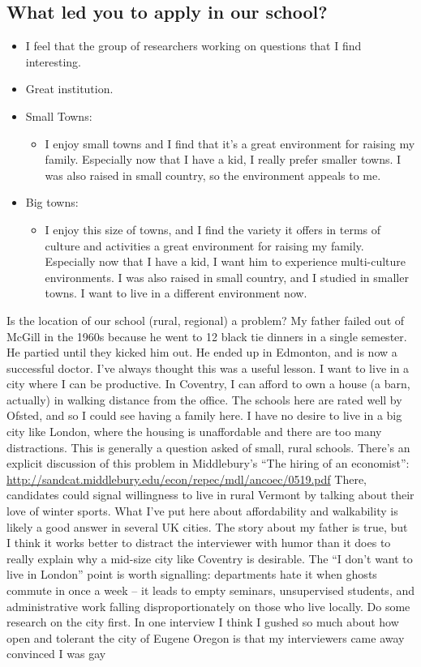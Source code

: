 \documentclass[12pt]{article}
\theoremstyle{plain}
\theoremstyle{plain}
\theoremstyle{plain}
\theoremstyle{plain}
\theoremstyle{plain}
\theoremstyle{plain}
\begin{document}
\subsection{What led you to apply in our school?}
\label{sec:orged3c6f1}
\begin{itemize}
\item I feel that the group of researchers working on questions that I find interesting.
\item Great institution.
\item Small Towns:
\begin{itemize}
\item I enjoy small towns and I find that it's a great environment for raising my family.
Especially now that I have a kid, I really prefer smaller towns.
I was also raised in small country, so the environment appeals to me.
\end{itemize}
\item Big towns:
\begin{itemize}
\item I enjoy this size of towns, and I find the variety it offers in terms of culture and activities a great environment for raising my family.
Especially now that I have a kid, I want him to experience multi-culture environments.
I was also raised in small country, and I studied in smaller towns. I want to live in a different environment now.
\end{itemize}
\end{itemize}


Is the location of our school (rural, regional) a problem?
My father failed out of McGill in the 1960s because he went to 12 black tie dinners in a single semester. He partied until they kicked him out. He ended up in Edmonton, and is now a successful doctor. I’ve always thought this was a useful lesson. I want to live in a city where I can be productive. In Coventry, I can afford to own a house (a barn, actually) in walking distance from the office. The schools here are rated well by Ofsted, and so I could see having a family here. I have no desire to live in a big city like London, where the housing is unaffordable and there are too many distractions.
This is generally a question asked of small, rural schools. There’s an explicit discussion of this problem in Middlebury’s “The hiring of an economist”:
\url{http://sandcat.middlebury.edu/econ/repec/mdl/ancoec/0519.pdf}
There, candidates could signal willingness to live in rural Vermont by talking about their love of winter sports. What I’ve put here about affordability and walkability is likely a good answer in several UK cities. The story about my father is true, but I think it works better to distract the interviewer with humor than it does to really explain why a mid-size city like Coventry is desirable. The “I don’t want to live in London” point is worth signalling: departments hate it when ghosts commute in once a week -- it leads to empty seminars, unsupervised students, and administrative work falling disproportionately on those who live locally. Do some research on the city first.
In one interview I think I gushed so much about how open and tolerant the city of Eugene Oregon is that my interviewers came away convinced I was gay
\end{document}

